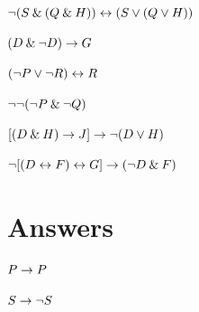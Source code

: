 \begin{small}
\begin{earg}
\item ${\neg}(S \mathbin{\&} (Q \mathbin{\&} H)) \leftrightarrow (S \vee (Q \vee H))$

\item	$(D \mathbin{\&} {\neg} D) \rightarrow G $

\item	$({\neg} P \vee {\neg} R) \leftrightarrow R $

\item	${\neg} {\neg} ({\neg} P \mathbin{\&} {\neg} Q)  $

\item 	$[(D \mathbin{\&} H) \rightarrow J] \rightarrow {\neg}(D \vee H) $

\item	${\neg} [(D \leftrightarrow F) \leftrightarrow G] \rightarrow ({\neg} D \mathbin{\&} F) $

\end{earg}





\section{Answers}
\setcounter{ProbPart}{0}

\problempart\label{pr.TT.TTorC-a}

\begin{earg}

\item $P \rightarrow P$ %
\vspace{1em}

\noindent\begin{minipage}{0.99\textwidth}
\item $S \rightarrow{\neg} S$ %
\vspace{1em}
\end{minipage}


\end{earg}
\end{small}
